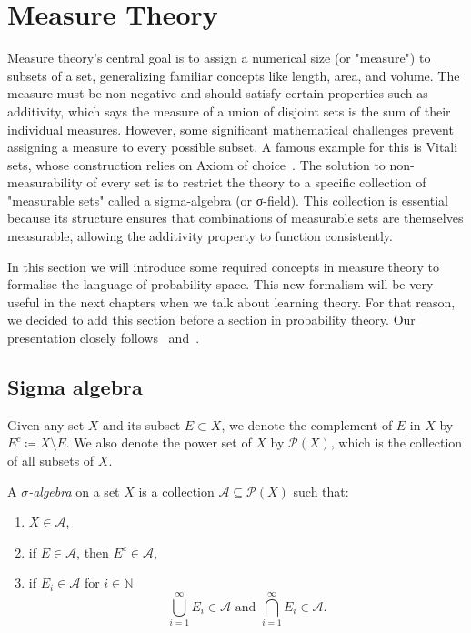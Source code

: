 \section{Measure Theory}\label{sec:measure-theory}



Measure theory's central goal is to assign a numerical size (or "measure") to subsets of a set, generalizing familiar concepts like length, area, and volume. The measure must be non-negative and should satisfy certain properties such as additivity, which says the measure of a union of disjoint sets is the sum of their individual measures. However, some significant mathematical challenges prevent assigning a measure to every possible subset. A famous example for this is Vitali sets, whose construction relies on Axiom of choice~\cite{HerrlichAxiomOfChoice}. The solution to non-measurability of every set is to restrict the theory to a specific collection of "measurable sets" called a sigma-algebra (or σ-field). This collection is essential because its structure ensures that combinations of measurable sets are themselves measurable, allowing the additivity property to function consistently.


In this section we will introduce some required concepts in measure theory to formalise the language of probability space. This new formalism will be very useful in the next chapters when we talk about learning theory. For that reason, we decided to add this section before a section in probability theory. Our presentation closely follows~\cite{MeasureTheoryCohn} and~\cite{MeasureTheoryLeGall}.

\subsection{Sigma algebra}

Given any set $X$ and its subset $E \subset X$, we denote the complement of $E$ in $X$ by $E^c \coloneq X \setminus E$. We also denote the power set of $X$ by $\mathcal{P}(X)$, which is the collection of all subsets of $X$.

\begin{definition}
    \label{def:sigma-algebra}
    A \emph{$\sigma$-algebra} on a set $X$ is a collection $\mathcal{A} \subseteq \mathcal{P}(X)$ such that:
    \begin{enumerate}[label=(\roman*)]
        \item $X \in \mathcal{A}$,
        \item if $E \in \mathcal{A}$, then $E^c \in \mathcal{A}$,
        \item if $E_i \in \mathcal{A}$ for $i \in \mathbb{N}$
        \[
            \bigcup_{i=1}^\infty E_i \in \mathcal{A} \textrm{ and } \bigcap_{i=1}^\infty E_i \in \mathcal{A}.
        \]
    \end{enumerate}

\end{definition}

